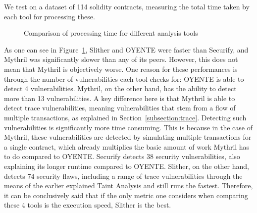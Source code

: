 \documentclass[letterpaper,twocolumn,10pt]{article}
\begin{document}
We test on a dataset \cite{data} of 114 solidity contracts, measuring the total time taken by each tool for processing these.
\begin{figure}
\centering

\caption{Comparison of processing time for different analysis tools\label{perf:speed}}
\end{figure}



As one can see in Figure~\ref{perf:speed}, Slither and OYENTE were faster than Securify, and Mythril was significantly slower than any of its peers. However, this does not mean that Mythril is objectively worse. One reason for these performances is through the number of vulnerabilities each tool checks for: OYENTE is able to detect 4 vulnerabilities. Mythril, on the other hand, has the ability to detect more than 13 vulnerabilities. A key difference here is that Mythril is able to detect trace vulnerabilities, meaning vulnerabilities that stem from a flow of multiple transactions, as explained in Section~\ref{subsection:trace}. Detecting such vulnerabilities is significantly more time consuming. This is because in the case of Mythril, these vulnerabilities are detected by simulating multiple transactions for a single contract, which already multiplies the basic amount of work Mythril has to do compared to OYENTE. Securify detects 38 security vulnerabilities, also explaining its longer runtime compared to OYENTE. Slither, on the other hand, detects 74 security flaws, including a range of trace vulnerabilities through the means of the earlier explained Taint Analysis and still runs the fastest. Therefore, it can be conclusively said that if the only metric one considers when comparing these 4 tools is the execution speed, Slither is the best.
\end{document}

